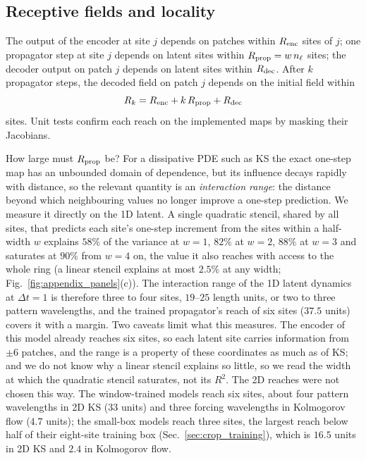 \subsection{Receptive fields and locality}
\label{sec:receptive}

The output of the encoder at site $j$ depends on patches within
$R_{\mathrm{enc}}$ sites of $j$; one propagator step at site $j$ depends on latent
sites within $R_{\mathrm{prop}} = w\,n_\ell$ sites; the decoder output on patch $j$
depends on latent sites within $R_{\mathrm{dec}}$. After $k$ propagator steps,
the decoded field on patch $j$ depends on the initial field within
\begin{equation}
  R_k = R_{\mathrm{enc}} + k\,R_{\mathrm{prop}} + R_{\mathrm{dec}}
  \label{eq:light_cone}
\end{equation}
sites. Unit tests confirm each reach on the implemented maps by masking
their Jacobians.

How large must $R_{\mathrm{prop}}$ be? For a dissipative PDE such as KS the exact
one-step map has an unbounded domain of dependence, but its influence
decays rapidly with distance, so the relevant quantity is an
\emph{interaction range}: the distance beyond which neighbouring values
no longer improve a one-step prediction. We measure it directly on the
1D latent. A single quadratic stencil, shared by all sites, that predicts
each site's one-step increment from the sites within a half-width $w$
explains $58\%$ of the variance at $w=1$, $82\%$ at $w=2$, $88\%$ at
$w=3$ and saturates at $90\%$ from $w=4$ on, the value it also reaches
with access to the whole ring (a linear stencil explains at most
$2.5\%$ at any width; Fig.~\ref{fig:appendix_panels}(c)). The interaction range of the 1D latent dynamics at
$\Delta t=1$ is therefore three to four sites, $19$--$25$ length units, or
two to three pattern wavelengths, and the trained propagator's reach of
six sites ($37.5$ units) covers it with a margin. Two caveats limit what
this measures. The encoder of this model already reaches six sites, so
each latent site carries information from $\pm6$ patches, and the range
is a property of these coordinates as much as of KS; and we do not know
why a linear stencil explains so little, so we read the width at which
the quadratic stencil saturates, not its $R^2$. The 2D reaches were not
chosen this way. The window-trained models reach six sites, about four
pattern wavelengths in 2D KS ($33$ units) and three forcing wavelengths
in Kolmogorov flow ($4.7$ units); the small-box models reach three sites,
the largest reach below half of their eight-site training box
(Sec.~\ref{sec:crop_training}), which is $16.5$ units in 2D KS and $2.4$ in
Kolmogorov flow.

